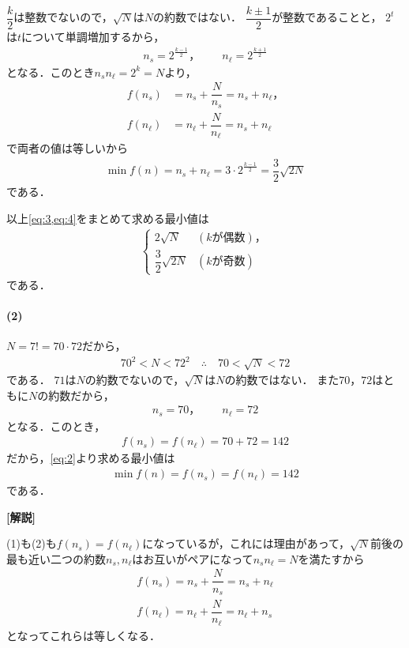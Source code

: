 \documentclass[../../main.tex]{subfiles}
\begin{document}
$\dfrac{k}{2}$は整数でないので，$\sqrt{N}$は$N$の約数ではない．
$\dfrac{k\pm 1}{2}$が整数であることと，
$2^t$は$t$について単調増加するから，
\begin{align}
  n_s=2^{\frac{k-1}{2}}，\qquad n_\ell=2^{\frac{k+1}{2}}
\end{align}
となる．このとき$n_sn_\ell=2^k=N$より，
\begin{align}
  f(n_s)&=n_s+\dfrac{N}{n_s}=n_s+n_\ell，\\
  f(n_\ell)&=n_\ell+\dfrac{N}{n_\ell}=n_s+n_\ell
\end{align}
で両者の値は等しいから
\begin{align}
  \min f(n)
  =n_s+n_\ell
  =3\cdot2^{\frac{k-1}{2}}=\dfrac{3}{2}\sqrt{2N} \label{eq:4}
\end{align}
である．
\casesend

以上\cref{eq:3,eq:4}をまとめて求める最小値は
\begin{align}
  \begin{cases}
    2\sqrt{N}             & (k\text{が偶数})，\\
    \dfrac{3}{2}\sqrt{2N} & (k\text{が奇数})
  \end{cases}
\end{align}
である．

\paragraph{(2)}

$N=7!=70\cdot72$だから，
\begin{align}
  70^2<N<72^2\quad\therefore\quad70<\sqrt{N}<72
\end{align}
である．
$71$は$N$の約数でないので，$\sqrt{N}$は$N$の約数ではない．
また$70$，$72$はともに$N$の約数だから，
\begin{align}
  n_s=70，\qquad n_\ell=72
\end{align}
となる．このとき，
\begin{align}
  f(n_s)=f(n_\ell)=70+72=142
\end{align}
だから，\cref{eq:2}より求める最小値は
\begin{align}
  \min f(n) = f(n_s) = f(n_{\ell}) = 142
\end{align}
である．

{\bf [解説]}

(1)も(2)も$f(n_s)=f(n_{\ell})$になっているが，これには理由があって，$\sqrt{N}$前後の最も近い二つの約数$n_{s}, n_{\ell}$はお互いがペアになって$n_{s}n_{\ell}=N$を満たすから
\begin{align}
  f(n_s) = n_s + \dfrac{N}{n_s} = n_{s} + n_{\ell} \\
  f(n_{\ell}) = n_{\ell} + \dfrac{N}{n_{\ell}} = n_{\ell} + n_{s}
\end{align}
となってこれらは等しくなる．
\end{document}
